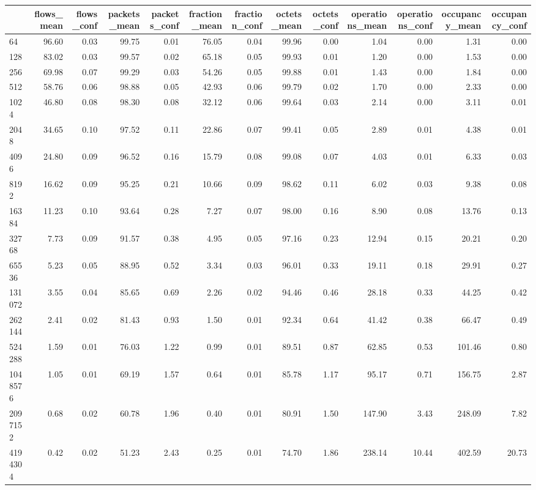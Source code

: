 \begin{tabular}{lrrrrrrrrrrrr}
\toprule
 & flows_mean & flows_conf & packets_mean & packets_conf & fraction_mean & fraction_conf & octets_mean & octets_conf & operations_mean & operations_conf & occupancy_mean & occupancy_conf \\
\midrule
64 & 96.60 & 0.03 & 99.75 & 0.01 & 76.05 & 0.04 & 99.96 & 0.00 & 1.04 & 0.00 & 1.31 & 0.00 \\
128 & 83.02 & 0.03 & 99.57 & 0.02 & 65.18 & 0.05 & 99.93 & 0.01 & 1.20 & 0.00 & 1.53 & 0.00 \\
256 & 69.98 & 0.07 & 99.29 & 0.03 & 54.26 & 0.05 & 99.88 & 0.01 & 1.43 & 0.00 & 1.84 & 0.00 \\
512 & 58.76 & 0.06 & 98.88 & 0.05 & 42.93 & 0.06 & 99.79 & 0.02 & 1.70 & 0.00 & 2.33 & 0.00 \\
1024 & 46.80 & 0.08 & 98.30 & 0.08 & 32.12 & 0.06 & 99.64 & 0.03 & 2.14 & 0.00 & 3.11 & 0.01 \\
2048 & 34.65 & 0.10 & 97.52 & 0.11 & 22.86 & 0.07 & 99.41 & 0.05 & 2.89 & 0.01 & 4.38 & 0.01 \\
4096 & 24.80 & 0.09 & 96.52 & 0.16 & 15.79 & 0.08 & 99.08 & 0.07 & 4.03 & 0.01 & 6.33 & 0.03 \\
8192 & 16.62 & 0.09 & 95.25 & 0.21 & 10.66 & 0.09 & 98.62 & 0.11 & 6.02 & 0.03 & 9.38 & 0.08 \\
16384 & 11.23 & 0.10 & 93.64 & 0.28 & 7.27 & 0.07 & 98.00 & 0.16 & 8.90 & 0.08 & 13.76 & 0.13 \\
32768 & 7.73 & 0.09 & 91.57 & 0.38 & 4.95 & 0.05 & 97.16 & 0.23 & 12.94 & 0.15 & 20.21 & 0.20 \\
65536 & 5.23 & 0.05 & 88.95 & 0.52 & 3.34 & 0.03 & 96.01 & 0.33 & 19.11 & 0.18 & 29.91 & 0.27 \\
131072 & 3.55 & 0.04 & 85.65 & 0.69 & 2.26 & 0.02 & 94.46 & 0.46 & 28.18 & 0.33 & 44.25 & 0.42 \\
262144 & 2.41 & 0.02 & 81.43 & 0.93 & 1.50 & 0.01 & 92.34 & 0.64 & 41.42 & 0.38 & 66.47 & 0.49 \\
524288 & 1.59 & 0.01 & 76.03 & 1.22 & 0.99 & 0.01 & 89.51 & 0.87 & 62.85 & 0.53 & 101.46 & 0.80 \\
1048576 & 1.05 & 0.01 & 69.19 & 1.57 & 0.64 & 0.01 & 85.78 & 1.17 & 95.17 & 0.71 & 156.75 & 2.87 \\
2097152 & 0.68 & 0.02 & 60.78 & 1.96 & 0.40 & 0.01 & 80.91 & 1.50 & 147.90 & 3.43 & 248.09 & 7.82 \\
4194304 & 0.42 & 0.02 & 51.23 & 2.43 & 0.25 & 0.01 & 74.70 & 1.86 & 238.14 & 10.44 & 402.59 & 20.73 \\

\end{tabular}
